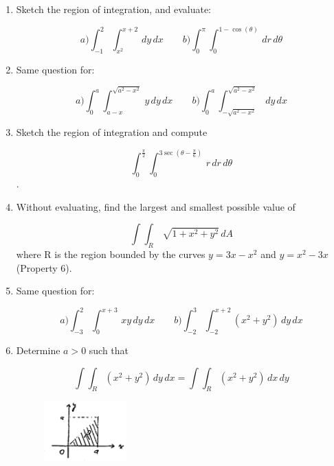 \documentclass[11pt]{amsbook}
\begin{document}



\begin{enumerate}[{1.}]	
	\item 
	Sketch the region of integration, and evaluate:
	
	$$
		a) \int_{-1} ^ {2} \int_{x^2} ^ {x+2}  \,dy \, dx         \qquad
		b)  \int_{0} ^ {\pi} \int_{0} ^ {1- \cos(\theta)}  \,dr \, d\theta  
	$$	
	
	\item
	Same question for:
	
	$$
		a ) 
		  \int_{0} ^ {a} \int_{a-x} ^ {\sqrt{a^2 - x^2}} \,y \,dy \, dx   \qquad	
		b ) 
		 \int_{0} ^ {a} \int_{- \sqrt{a^2 - x^2}} ^ {\sqrt{a^2 - x^2}}  \,dy \, dx  
	$$
	
	\item
	Sketch the region of integration and compute	
	
	$$ \int_{0} ^ {\frac{\pi}{2}} \int_{0} ^ {3 \sec(\theta -\frac{\pi}{6} )}  
	\,r \,dr \, d\theta  $$. 
	
	\item
	Without evaluating, find the largest and smallest possible
	value of
	
	$$
	\int  \int_{R}  \, {\sqrt{1 + x^2 + y^2}}  \,dA  
	$$
	where R is the region bounded by the curves
	$ y = 3x - x^2 $ and
	$ y = x^2 - 3x $ (Property 6).
	
	\item
	Same question for:
	
	$$
	a ) 
	\int_{-3} ^ {2} \int_{0} ^ {x+3} \,xy \,dy \, dx   \qquad	
	b ) 
	\int_{-2} ^ {3} \int_{-2} ^ {x+2}  \left( x^2 + y^2 \right) \,dy \, dx  
	$$
	
	\item
	Determine  $ a > 0$ such that
	
		$$
		\int  \int_{R} \left( x^2 + y^2\right)   \,dy \, dx =
		\int  \int_{R} \left( x^2 + y^2\right)   \,dx \, dy 
		$$
		
		\begin{figure}[htb]
	    \centering
	    \includegraphics[width=0.3\textwidth]{images/b2p2_page405_figure_001}
        \end{figure}
		

\end{enumerate}
\end{document}
